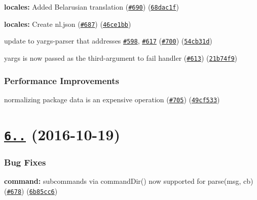 \begin{DoxyItemize}
\item {\bfseries locales\+:} Added Belarusian translation (\href{https://github.com/yargs/yargs/issues/690}{\tt \#690}) (\href{https://github.com/yargs/yargs/commit/68dac1f}{\tt 68dac1f})
\item {\bfseries locales\+:} Create nl.\+json (\href{https://github.com/yargs/yargs/issues/687}{\tt \#687}) (\href{https://github.com/yargs/yargs/commit/46ce1bb}{\tt 46ce1bb})
\item update to yargs-\/parser that addresses \href{https://github.com/yargs/yargs/issues/598}{\tt \#598}, \href{https://github.com/yargs/yargs/issues/617}{\tt \#617} (\href{https://github.com/yargs/yargs/issues/700}{\tt \#700}) (\href{https://github.com/yargs/yargs/commit/54cb31d}{\tt 54cb31d})
\item yargs is now passed as the third-\/argument to fail handler (\href{https://github.com/yargs/yargs/issues/613}{\tt \#613}) (\href{https://github.com/yargs/yargs/commit/21b74f9}{\tt 21b74f9})
\end{DoxyItemize}

\subsubsection*{Performance Improvements}


\begin{DoxyItemize}
\item normalizing package data is an expensive operation (\href{https://github.com/yargs/yargs/issues/705}{\tt \#705}) (\href{https://github.com/yargs/yargs/commit/49cf533}{\tt 49cf533})
\end{DoxyItemize}

\label{_6.3.0}%
 \section*{\href{https://github.com/yargs/yargs/compare/v6.2.0...v6.3.0}{\tt 6..} (2016-\/10-\/19)}

\subsubsection*{Bug Fixes}


\begin{DoxyItemize}
\item {\bfseries command\+:} subcommands via command\+Dir() now supported for parse(msg, cb) (\href{https://github.com/yargs/yargs/issues/678}{\tt \#678}) (\href{https://github.com/yargs/yargs/commit/6b85cc6}{\tt 6b85cc6})
\end{DoxyItemize}

